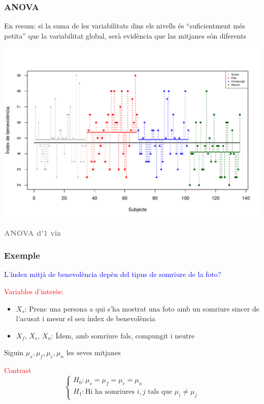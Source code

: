 \documentclass[12pt,t]{beamer}
\newcommand{\red}[1]{\textcolor{red}{#1}}
\newcommand{\blue}[1]{\textcolor{blue}{#1}}
\newcommand{\gray}[1]{\textcolor{gray}{#1}}
\theoremstyle{plain}
\theoremstyle{definition}
\begin{document}
\begin{frame}
\frametitle{ANOVA}\vspace*{-1ex}

En resum: si la suma de les variabilitats dins els nivells és ``suficientment més petita'' que la variabilitat global, serà  evidència  que las mitjanes són diferents\pause\vspace*{-1ex}

\begin{center}
{\includegraphics[width=\linewidth]{plotsmilecomplet2}}
\end{center}

\end{frame}






\begin{frame}
\vfill
\begin{center}
\gray{\LARGE\bf ANOVA d'1 via}
\end{center}
\end{frame}


\begin{frame}
\frametitle{Exemple}

\blue{L'índex mitjà de benevolència depèn del tipus de somriure de la foto?}\medskip


\red{Variables d'interès:}

\begin{itemize}
\item $X_s$: Prenc una persona a qui s'ha mostrat una foto amb un somriure sincer de l'acusat i mesur el seu índex de benevolència
\item $X_f$, $X_c$, $X_n$: Ídem, amb somriure fals, compungit i neutre
\end{itemize}
\medskip

Siguin $\mu_s,\mu_f,\mu_c,\mu_n$ les seves mitjanes\medskip

\red{Contrast}
$$
\left\{
\begin{array}{l}
H_0 : \mu_s=\mu_{f}=\mu_{c}=\mu_{n} \\
H_1 : \mbox{Hi ha  somriures }i,j\mbox{ tals que }  \mu_i \not=\mu_j
\end{array}
\right.
$$

\end{frame}
\end{document}
